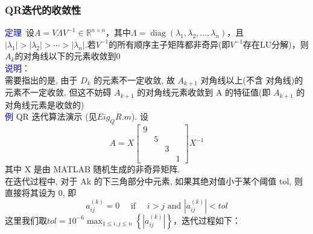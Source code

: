 \documentclass[12pt,a4paper]{article}
\begin{document}
	\subsubsection{QR迭代的收敛性}
	\textcolor{blue}{定理}~设$A=V \Lambda V^{-1} \in \mathbb{R}^{n \times n}$，其中$\Lambda=\operatorname{diag}\left(\lambda_{1}, \lambda_{2}, \ldots, \lambda_{n}\right)$，且$\left|\lambda_{1}\right|>\left|\lambda_{2}\right|>\cdots>\left|\lambda_{n}\right|$.若$V^{-1}$的所有顺序主子矩阵都非奇异(即$V^{-1}$存在LU分解)，则$A_{k}$的对角线以下的元素收敛到0\\
	\textcolor{blue}{说明}：\\
	需要指出的是, 由于 $D_{k}$ 的元素不一定收敛, 故 $A_{k+1}$ 对角线以上(不含 对角线)的元素不一定收敛, 但这不妨碍 $A_{k+1}$ 的对角线元素收敛到 A 的特征值(即 $A_{k+1}$ 的对角线元素是收敛的)\\
	\textcolor{blue}{例} QR 迭代算法演示 (见$Eig_QR.m$). 设
	$$
	A=X\left[\begin{array}{cccc}
	{9}&&& \\ 
	&{5}&& \\
	&&3& \\ 
	&&&{1}
	\end{array}\right] X^{-1}
	$$
	其中 X 是由 MATLAB 随机生成的非奇异矩阵.\\
	在迭代过程中, 对于 Ak 的下三角部分中元素, 如果其绝对值小于某个阈值 tol, 则直接将其设为 0, 即
	$$
	a_{i j}^{(k)}=0 \quad \text { if } \quad i>j \text { and }\left|a_{i j}^{(k)}\right|<t o l
	$$
	这里我们取$t o l=10^{-6} \max _{1 \leq i, j \leq n}\left\{\left|a_{i j}^{(k)}\right|\right\}$，迭代过程如下：
\end{document}
